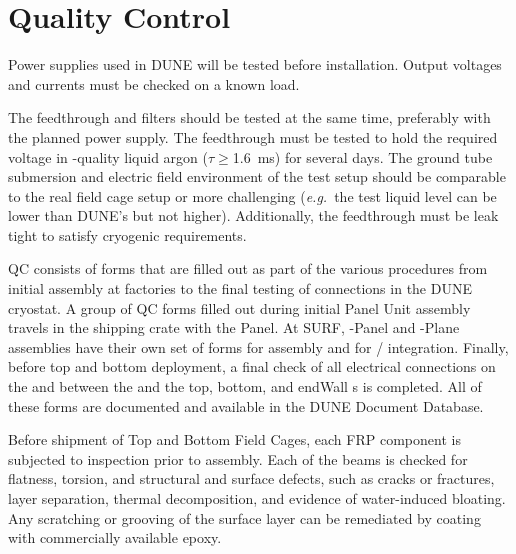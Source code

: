 \section{Quality Control}
\label{sec:fdsp-hv-qc}

Power supplies used in DUNE will be tested before installation.  Output voltages and currents must be checked on a known load. 

The feedthrough and filters should be tested at the same time, preferably with the planned power supply.  The feedthrough must be tested to hold the required voltage in -quality liquid argon ($\tau\geq$\SI{1.6}{ms}) for several days.  The ground tube submersion and electric field environment of the test setup should be comparable to the real field cage setup or more challenging ({\it e.g.}\ the test liquid level can be lower than DUNE's but not higher).  Additionally, the feedthrough must be leak tight to satisfy cryogenic requirements.

 QC consists of forms that are filled out as part of the various procedures from initial assembly at factories to the final testing of connections in the DUNE cryostat.  A group of QC forms filled out during initial Panel Unit assembly travels in the shipping crate with the Panel.  At SURF, -Panel and -Plane assemblies have their own set of  forms for  assembly and for / integration.  Finally, before top and bottom  deployment, a final check of all electrical connections on the  and between the  and the top, bottom, and endWall s is completed.  All of these forms are documented and available in the DUNE Document Database.

Before shipment of Top and Bottom Field Cages, each FRP component is subjected to inspection prior to assembly. Each of the beams is checked for flatness, torsion, and structural and surface defects, such as cracks or fractures, layer separation, thermal decomposition, and evidence of water-induced bloating. Any scratching or grooving of the surface layer can be remediated by coating with commercially available epoxy.


